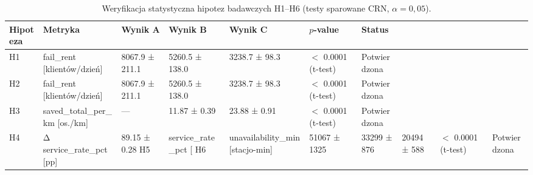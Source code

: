 \begin{table}[htbp]
\centering
\caption{Weryfikacja statystyczna hipotez badawczych H1--H6 (testy sparowane CRN, $\alpha = 0{,}05$).}
\label{tab:hypotheses}
\begin{tabular}{lllllll}
\toprule
Hipoteza & Metryka & Wynik A & Wynik B & Wynik C & $p$-value & Status \\
\midrule
H1 & fail_rent [klientów/dzień] & 8067.9 ± 211.1 & 5260.5 ± 138.0 & 3238.7 ± 98.3 & $<$ 0.0001 (t-test) & Potwierdzona \\
H2 & fail_rent [klientów/dzień] & 8067.9 ± 211.1 & 5260.5 ± 138.0 & 3238.7 ± 98.3 & $<$ 0.0001 (t-test) & Potwierdzona \\
H3 & saved_total_per_km [os./km] & — & 11.87 ± 0.39 & 23.88 ± 0.91 & $<$ 0.0001 (t-test) & Potwierdzona \\
H4 & Δ service_rate_pct [pp] & 89.15 ± 0.28%
H5 & service_rate_pct [%
H6 & unavailability_min [stacjo-min] & 51067 ± 1325 & 33299 ± 876 & 20494 ± 588 & $<$ 0.0001 (t-test) & Potwierdzona \\
\bottomrule
\end{tabular}
\end{table}
